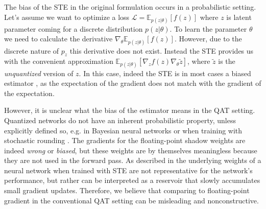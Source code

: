The bias of the STE in the original formulation occurs in a probabilistic setting. Let's assume we want to optimize a loss $\mathcal{L} = \mathbb{E}_{p(z|\theta)} \left[f(z)\right]$ where $z$ is latent parameter coming for a discrete distribution $p(z|\theta)$. To learn the parameter $\theta$ we need to calculate the derivative $\nabla_{\theta} \mathbb{E}_{p(z|\theta)} \left[f(z)\right]$. However, due to the discrete nature of $p_z$ this derivative does not exist. Instead the STE provides us with the convenient approximation $\mathbb{E}_{p(z|\theta)}\left[\nabla_{z}f(z) \nabla_{\theta}\tilde{z} \right]$, where $\tilde{z}$ is the \textit{unquantized} version of $z$. In this case, indeed the STE is in most cases a biased estimator \cite{pervez2020lowbl}, as the expectation of the gradient does not match with the gradient of the expectation. 



However, it is unclear what the bias of the estimator means in the QAT setting. Quantized networks do not have an inherent probabilistic property, unless explicitly defined so, e.g. in Bayesian neural networks or when training with stochastic rounding \cite{Gupta2015, louizos2018relaxed}. The gradients for the floating-point shadow weights are indeed \textit{wrong} or \textit{biased}, but these weights are by themselves meaningless because they are not used in the forward pass. As described in \cite{helwegen2019latent} the underlying weights of a neural network when trained with STE are not representative for the network's performance, but rather can be interpreted as a reservoir that slowly accumulates small gradient updates. Therefore, we believe that comparing to floating-point gradient in the conventional QAT setting can be misleading and nonconstructive. 



